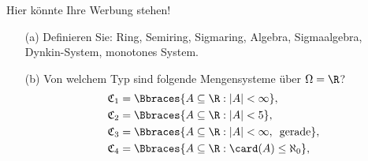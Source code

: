 \begin{exercise}

Hier könnte Ihre Werbung stehen!

\begin{itemize}
  \item[(a)] Definieren Sie: Ring, Semiring, Sigmaring, Algebra, Sigmaalgebra, Dynkin-System, monotones System.
  \item[(b)] Von welchem Typ sind folgende Mengensysteme über $\Omega = \R$?
  \begin{align*}
    \mathfrak{C}_1 & = \Bbraces{A \subseteq \R: |A| < \infty}, \\
    \mathfrak{C}_2 & = \Bbraces{A \subseteq \R: |A| < 5}, \\
    \mathfrak{C}_3 & = \Bbraces{A \subseteq \R: |A| < \infty, \enspace \text{gerade}}, \\
    \mathfrak{C}_4 & = \Bbraces{A \subseteq \R: \card(A) \leq \aleph_0}, \\
  \end{align*}
\end{itemize}

\end{exercise}

